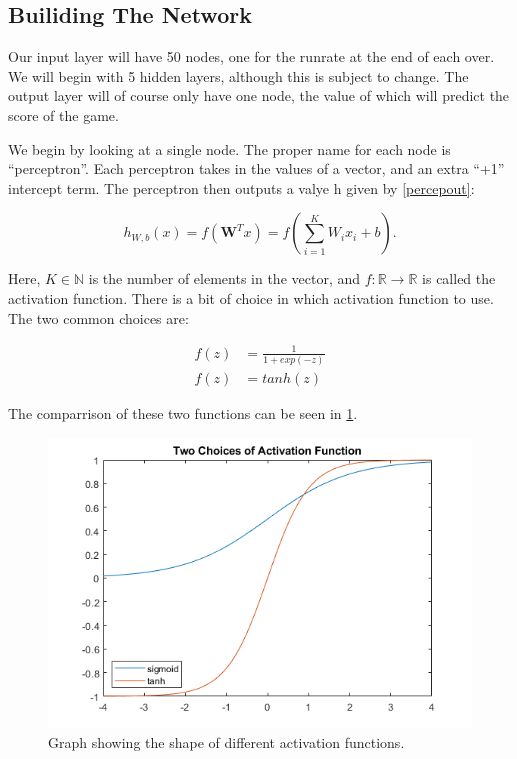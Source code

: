 \subsection{Builiding The Network}
Our input layer will have 50 nodes, one for the runrate at the end of each over. We will begin with 5 hidden layers, although this is subject to change. The output layer
will of course only have one node, the value of which will predict the score of the game. 

We begin by looking at a single node. The proper name for each node is ``perceptron''. Each perceptron takes in the values of a vector, and an extra ``+1'' intercept term. The perceptron then outputs a valye h given by \ref{percepout}:

\begin{equation}
    \label{percepout}
    h_{W,b}(x) = f(\textbf{W}^Tx) = f(\sum_{i=1}^KW_ix_i+b).
\end{equation}

Here, $K \in \mathbb{N}$ is the number of elements in the vector, and $f:\mathbb{R} \rightarrow \mathbb{R}$ is called the activation function. There is a bit of choice in which activation function to use.
The two common choices are:

\begin{align}
    f(z) &= \frac{1}{1+exp(-z)} \\
    f(z) &= tanh(z)
\end{align}

The comparrison of these two functions can be seen in \ref{actfig}.

\begin{figure}[h]
    \centering
    \label{actfig}
    \includegraphics[scale=0.5]{figures/actfuncs.png}
    \caption{Graph showing the shape of different activation functions.}
\end{figure}

